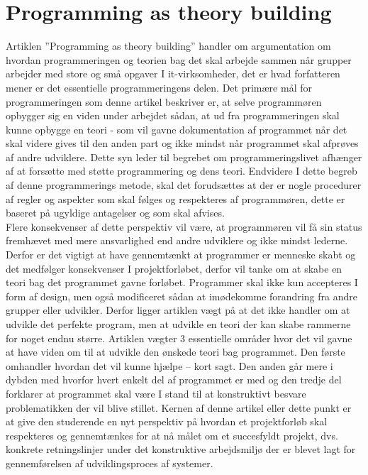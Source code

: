 \documentclass[12pt]{article}   %
\begin{document}
\section{Programming as theory building}

Artiklen ”Programming as theory building” handler om argumentation om hvordan programmeringen og teorien bag det skal arbejde sammen når grupper arbejder med store og små opgaver I it-virksomheder,  det er hvad forfatteren mener er det essentielle programmeringens delen. Det primære mål for programmeringen som denne artikel beskriver er, at selve programmøren opbygger sig en viden under arbejdet sådan, at ud fra programmeringen skal kunne opbygge en teori - som vil gavne dokumentation af programmet når det skal videre gives til den anden part og ikke mindst når programmet skal afprøves af andre udviklere. Dette syn leder til begrebet om programmeringslivet afhænger af at forsætte med støtte programmering og dens teori. Endvidere I dette begreb af denne programmerings metode, skal det forudsættes at der er nogle procedurer af regler og aspekter som skal følges og respekteres af programmøren, dette er baseret på ugyldige antagelser og som skal afvises.  \\
Flere konsekvenser af dette perspektiv vil være, at programmøren vil få sin status fremhævet med mere ansvarlighed end andre udviklere og ikke mindst lederne. Derfor er det vigtigt at have gennemtænkt at programmer er menneske skabt og det medfølger konsekvenser I projektforløbet, derfor vil tanke om at skabe en teori bag det programmet gavne forløbet. Programmer skal ikke kun accepteres I form af design, men også modificeret sådan at imødekomme forandring fra andre grupper eller udvikler. Derfor ligger artiklen vægt på at det ikke handler om at udvikle det perfekte program, men at udvikle en teori der kan skabe rammerne for noget endnu større. Artiklen vægter 3 essentielle områder hvor det vil gavne at have viden om til at udvikle den ønskede teori bag programmet. Den første omhandler hvordan det vil kunne hjælpe – kort sagt. Den anden går mere i dybden med hvorfor hvert enkelt del af programmet er med og den tredje del forklarer at programmet skal være I stand til at konstruktivt besvare problematikken der vil blive stillet. 
Kernen af denne artikel eller dette punkt er at give den studerende en nyt perspektiv på hvordan et projektforløb skal respekteres og gennemtænkes for at nå målet om et succesfyldt projekt, dvs. konkrete retningslinjer under det konstruktive arbejdsmiljø der er blevet lagt for gennemførelsen af udviklingsproces af systemer.  
\end{document}
